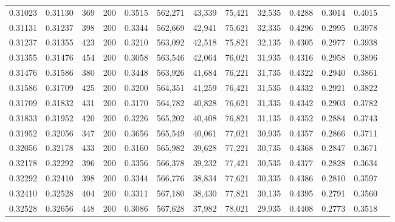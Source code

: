 \begin{tabular}{rrrrrrrrrrrrr}
0.31023 & 0.31130 &    369 & 200 &                                     0.3515 & 562,271 &  43,339 &  75,421 &  32,535 & 0.4288 & 0.3014 & 0.4015 \\
0.31131 & 0.31237 &    398 & 200 &                                     0.3344 & 562,669 &  42,941 &  75,621 &  32,335 & 0.4296 & 0.2995 & 0.3978 \\
0.31237 & 0.31355 &    423 & 200 &                                     0.3210 & 563,092 &  42,518 &  75,821 &  32,135 & 0.4305 & 0.2977 & 0.3938 \\
0.31355 & 0.31476 &    454 & 200 &                                     0.3058 & 563,546 &  42,064 &  76,021 &  31,935 & 0.4316 & 0.2958 & 0.3896 \\
0.31476 & 0.31586 &    380 & 200 &                                     0.3448 & 563,926 &  41,684 &  76,221 &  31,735 & 0.4322 & 0.2940 & 0.3861 \\
0.31586 & 0.31709 &    425 & 200 &                                     0.3200 & 564,351 &  41,259 &  76,421 &  31,535 & 0.4332 & 0.2921 & 0.3822 \\
0.31709 & 0.31832 &    431 & 200 &                                     0.3170 & 564,782 &  40,828 &  76,621 &  31,335 & 0.4342 & 0.2903 & 0.3782 \\
0.31833 & 0.31952 &    420 & 200 &                                     0.3226 & 565,202 &  40,408 &  76,821 &  31,135 & 0.4352 & 0.2884 & 0.3743 \\
0.31952 & 0.32056 &    347 & 200 &                                     0.3656 & 565,549 &  40,061 &  77,021 &  30,935 & 0.4357 & 0.2866 & 0.3711 \\
0.32056 & 0.32178 &    433 & 200 &                                     0.3160 & 565,982 &  39,628 &  77,221 &  30,735 & 0.4368 & 0.2847 & 0.3671 \\
0.32178 & 0.32292 &    396 & 200 &                                     0.3356 & 566,378 &  39,232 &  77,421 &  30,535 & 0.4377 & 0.2828 & 0.3634 \\
0.32292 & 0.32410 &    398 & 200 &                                     0.3344 & 566,776 &  38,834 &  77,621 &  30,335 & 0.4386 & 0.2810 & 0.3597 \\
0.32410 & 0.32528 &    404 & 200 &                                     0.3311 & 567,180 &  38,430 &  77,821 &  30,135 & 0.4395 & 0.2791 & 0.3560 \\
0.32528 & 0.32656 &    448 & 200 &                                     0.3086 & 567,628 &  37,982 &  78,021 &  29,935 & 0.4408 & 0.2773 & 0.3518 \\

\end{tabular}
